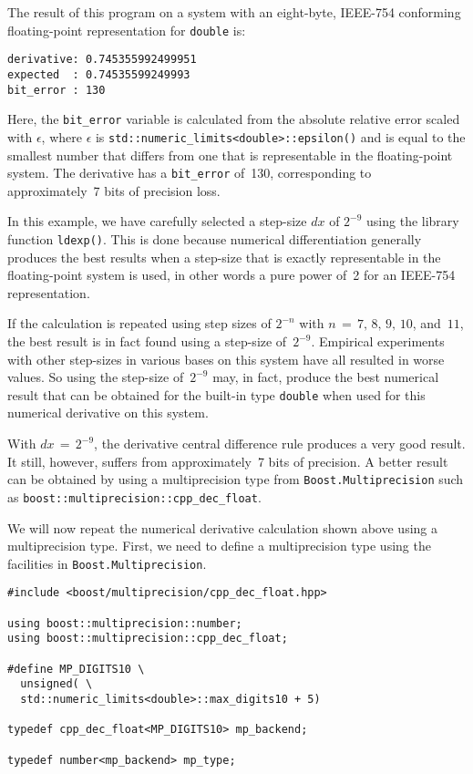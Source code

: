 \documentclass{article}[10pt]
\begin{document}
The result of this program on a system with an eight-byte,
IEEE-754 conforming floating-point representation for
{\lstinline|double|} is:

\begin{lstlisting}
derivative: 0.745355992499951
expected  : 0.74535599249993
bit_error : 130
\end{lstlisting}

Here, the {\lstinline|bit_error|} variable
is calculated from the absolute
relative error scaled with $\epsilon$, where $\epsilon$
is {\lstinline|std::numeric_limits<double>::epsilon()|}
and is equal to the smallest number that differs from
one that is representable in the floating-point system.
The derivative has a {\lstinline|bit_error|} of~130,
corresponding to approximately~7 bits of precision loss.

In this example, we have carefully selected a step-size
$dx$ of $2^{-9}$ using the library function {\lstinline|ldexp()|}.
This is done because numerical differentiation
generally produces the best results when a step-size
that is exactly representable in the floating-point
system is used, in other words a pure power of~2
for an IEEE-754 representation.

If the calculation is repeated using step sizes of
$2^{-n}$ with $n\,=\,7,\,8,\,9,\,10$, and~$11$,
the best result is in fact found using
a step-size of~$2^{-9}$.
Empirical experiments with other step-sizes in various
bases on this system have all resulted in worse values.
So using the step-size of~$2^{-9}$ may, in fact,
produce the best numerical result that can be obtained
for the built-in type {\lstinline|double|} when used for
this numerical derivative on this system.

With $dx\,=\,2^{-9}$, the derivative central difference rule
produces a very good result. It still, however, suffers
from approximately~7 bits of precision. A better result
can be obtained by using a multiprecision type from
{\lstinline|Boost.Multiprecision|} such as
{\lstinline|boost::multiprecision::cpp_dec_float|}.

We will now repeat the numerical derivative calculation
shown above using a multiprecision type. First, we need to
define a multiprecision type using the facilities in
{\lstinline|Boost.Multiprecision|}.

\begin{lstlisting}
#include <boost/multiprecision/cpp_dec_float.hpp>

using boost::multiprecision::number;
using boost::multiprecision::cpp_dec_float;

#define MP_DIGITS10 \
  unsigned( \
  std::numeric_limits<double>::max_digits10 + 5)

typedef cpp_dec_float<MP_DIGITS10> mp_backend;

typedef number<mp_backend> mp_type;
\end{lstlisting}
\end{document}
